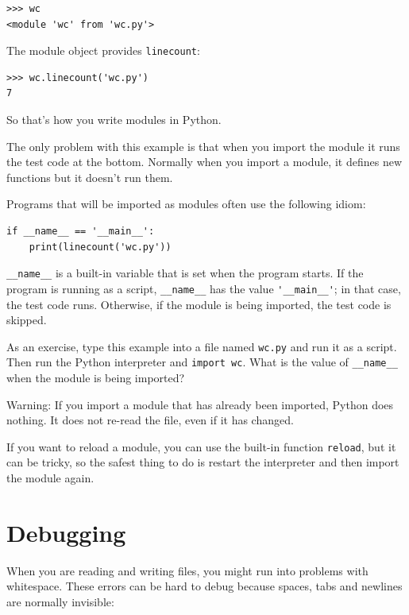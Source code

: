 \documentclass[10pt]{book}
\begin{document}
\begin{verbatim}
>>> wc
<module 'wc' from 'wc.py'>
\end{verbatim}
%
The module object provides \verb"linecount":

\begin{verbatim}
>>> wc.linecount('wc.py')
7
\end{verbatim}
%
So that's how you write modules in Python.

The only problem with this example is that when you import
the module it runs the test code at the bottom.  Normally
when you import a module, it defines new functions but it
doesn't run them.

Programs that will be imported as modules often
use the following idiom:

\begin{verbatim}
if __name__ == '__main__':
    print(linecount('wc.py'))
\end{verbatim}
%
\verb"__name__" is a built-in variable that is set when the
program starts.  If the program is running as a script,
\verb"__name__" has the value \verb"'__main__'"; in that
case, the test code runs.  Otherwise,
if the module is being imported, the test code is skipped.


As an exercise, type this example into a file named {\tt wc.py} and run
it as a script.  Then run the Python interpreter and
{\tt import wc}.  What is the value of \verb"__name__"
when the module is being imported?

Warning: If you import a module that has already been imported,
Python does nothing.  It does not re-read the file, even if it has
changed.

If you want to reload a module, you can use the built-in function 
{\tt reload}, but it can be tricky, so the safest thing to do is
restart the interpreter and then import the module again.


\section{Debugging}

When you are reading and writing files, you might run into problems
with whitespace.  These errors can be hard to debug because spaces,
tabs and newlines are normally invisible:
\end{document}
